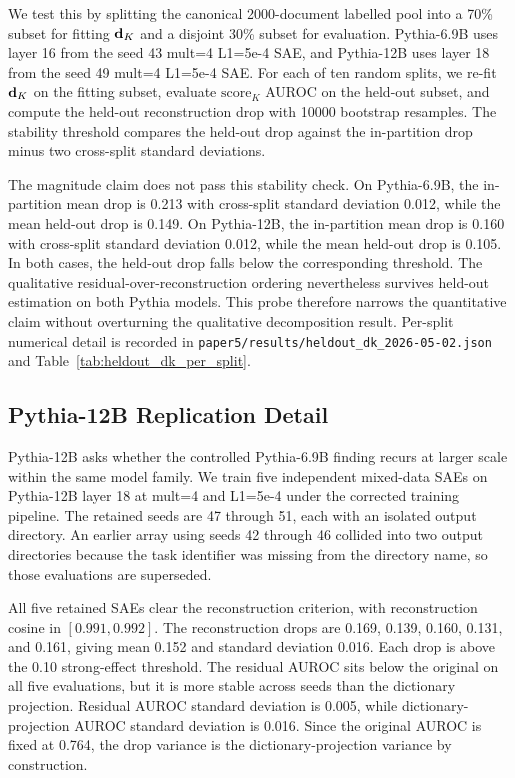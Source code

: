 We test this by splitting the canonical 2000-document labelled pool into a 70\% subset for fitting $\mathbf{d}_K$ and a disjoint 30\% subset for evaluation. Pythia-6.9B uses layer 16 from the seed 43 mult=4 L1=5e-4 SAE, and Pythia-12B uses layer 18 from the seed 49 mult=4 L1=5e-4 SAE. For each of ten random splits, we re-fit $\mathbf{d}_K$ on the fitting subset, evaluate $\mathrm{score}_K$ AUROC on the held-out subset, and compute the held-out reconstruction drop with 10000 bootstrap resamples. The stability threshold compares the held-out drop against the in-partition drop minus two cross-split standard deviations.

The magnitude claim does not pass this stability check. On Pythia-6.9B, the in-partition mean drop is 0.213 with cross-split standard deviation 0.012, while the mean held-out drop is 0.149. On Pythia-12B, the in-partition mean drop is 0.160 with cross-split standard deviation 0.012, while the mean held-out drop is 0.105. In both cases, the held-out drop falls below the corresponding threshold. The qualitative residual-over-reconstruction ordering nevertheless survives held-out estimation on both Pythia models. This probe therefore narrows the quantitative claim without overturning the qualitative decomposition result. Per-split numerical detail is recorded in \texttt{paper5/\allowbreak{}results/\allowbreak{}heldout\_\allowbreak{}dk\_\allowbreak{}2026-\allowbreak{}05-\allowbreak{}02.json} and Table~\ref{tab:heldout_dk_per_split}.

\subsection{Pythia-12B Replication Detail}
\label{app:p12b_replication}

Pythia-12B asks whether the controlled Pythia-6.9B finding recurs at larger scale within the same model family. We train five independent mixed-data SAEs on Pythia-12B layer 18 at mult=4 and L1=5e-4 under the corrected training pipeline. The retained seeds are 47 through 51, each with an isolated output directory. An earlier array using seeds 42 through 46 collided into two output directories because the task identifier was missing from the directory name, so those evaluations are superseded.

All five retained SAEs clear the reconstruction criterion, with reconstruction cosine in $[0.991, 0.992]$. The reconstruction drops are 0.169, 0.139, 0.160, 0.131, and 0.161, giving mean 0.152 and standard deviation 0.016. Each drop is above the 0.10 strong-effect threshold. The residual AUROC sits below the original on all five evaluations, but it is more stable across seeds than the dictionary projection. Residual AUROC standard deviation is 0.005, while dictionary-projection AUROC standard deviation is 0.016. Since the original AUROC is fixed at 0.764, the drop variance is the dictionary-projection variance by construction.

